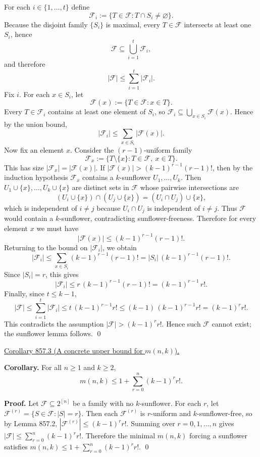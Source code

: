For each $i\in\{1,\dots,t\}$ define
\[
\mathcal F_i := \{T\in\mathcal F : T\cap S_i\ne\varnothing\}.
\]
Because the disjoint family $\{S_i\}$ is maximal, every $T\in\mathcal F$ intersects at least one $S_i$, hence
\[
\mathcal F \subseteq \bigcup_{i=1}^t \mathcal F_i,
\]
and therefore
\[
|\mathcal F| \le \sum_{i=1}^t |\mathcal F_i|.
\]
Fix $i$. For each $x\in S_i$, let
\[
\mathcal F(x) := \{T\in\mathcal F : x\in T\}.
\]
Every $T\in\mathcal F_i$ contains at least one element of $S_i$, so
$\mathcal F_i \subseteq \bigcup_{x\in S_i} \mathcal F(x)$.
Hence by the union bound,
\[
|\mathcal F_i| \le \sum_{x\in S_i} |\mathcal F(x)|.
\]
Now fix an element $x$. Consider the $(r-1)$-uniform family
\[
\mathcal F_x := \{T\setminus\{x\} : T\in\mathcal F,\ x\in T\}.
\]
This has size $|\mathcal F_x|=|\mathcal F(x)|$.
If $|\mathcal F(x)|>(k-1)^{r-1}(r-1)!$, then by the induction hypothesis $\mathcal F_x$ contains a $k$-sunflower $U_1,\dots,U_k$.
Then $U_1\cup\{x\},\dots,U_k\cup\{x\}$ are distinct sets in $\mathcal F$ whose pairwise intersections are
\[(U_i\cup\{x\})\cap (U_j\cup\{x\}) = (U_i\cap U_j)\cup\{x\},
\]
which is independent of $i\ne j$ because $U_i\cap U_j$ is independent of $i\ne j$.
Thus $\mathcal F$ would contain a $k$-sunflower, contradicting sunflower-freeness.
Therefore for every element $x$ we must have
\[
|\mathcal F(x)| \le (k-1)^{r-1}(r-1)!.
\]
Returning to the bound on $|\mathcal F_i|$, we obtain
\[
|\mathcal F_i| \le \sum_{x\in S_i} (k-1)^{r-1}(r-1)! = |S_i|\,(k-1)^{r-1}(r-1)!.
\]
Since $|S_i|=r$, this gives
\[
|\mathcal F_i| \le r\,(k-1)^{r-1}(r-1)! = (k-1)^{r-1}\, r!.
\]
Finally, since $t\le k-1$,
\[
|\mathcal F| \le \sum_{i=1}^t |\mathcal F_i| \le t\,(k-1)^{r-1} r! \le (k-1)\,(k-1)^{r-1} r! = (k-1)^r r!.
\]
This contradicts the assumption $|\mathcal F|>(k-1)^r r!$.
Hence such $\mathcal F$ cannot exist; the sunflower lemma follows.
\qed

\medskip
\noindent\underline{Corollary 857.3 (A concrete upper bound for $m(n,k)$).}

\textbf{Corollary.}
For all $n\ge 1$ and $k\ge 2$,
\[
 m(n,k) \le 1 + \sum_{r=0}^n (k-1)^r r!.
\]

\textbf{Proof.}
Let $\mathcal F\subseteq 2^{[n]}$ be a family with no $k$-sunflower. For each $r$, let
$\mathcal F^{(r)}=\{S\in\mathcal F: |S|=r\}$. Then each $\mathcal F^{(r)}$ is $r$-uniform and $k$-sunflower-free, so by Lemma 857.2,
$|\mathcal F^{(r)}|\le (k-1)^r r!$.
Summing over $r=0,1,\dots,n$ gives $|\mathcal F|\le \sum_{r=0}^n (k-1)^r r!$.
Therefore the minimal $m(n,k)$ forcing a sunflower satisfies $m(n,k)\le 1+\sum_{r=0}^n (k-1)^r r!$.
\qed

